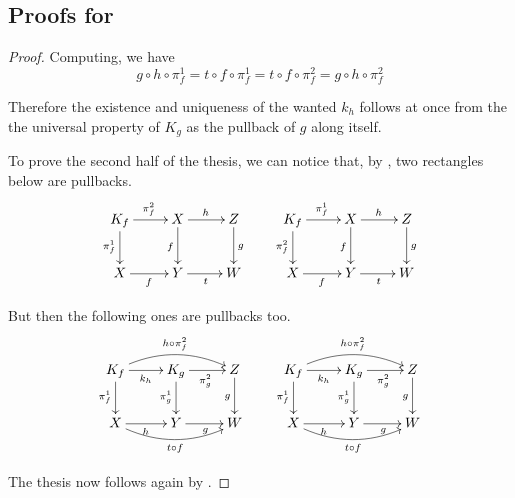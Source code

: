 \documentclass[a4paper,UKenglish,cleveref,pdftex,thm-restate,numberwithinsect]{lipics-v2021}
\def\C{\textbf {\textup{C}}}
\newcommand{\commentato}[1]{ {} }
\newcommand{\mto}{\rightarrowtail}
\newcommand{\id}[1]{\mathsf{id}_{#1}}
\begin{document}
\subsection{Proofs for }\label{app:primo}
\commentato{
\regmono*
\begin{proof}\label{regmono-proof}
	\begin{enumerate}
		\item  Consider the following cube in which the bottom face is an $\mathcal{M}$-pushout.
		\[\xymatrix@C=15pt@R=9pt{&A\ar[dd]|\hole_(.65){\id{A}}\ar[rr]^{g} \ar[dl]_{\id{A}} && B \ar[dd]^{\id{B}} \ar[dl]_(.6){\id{B}} \\ A  \ar@{>->}[dd]_{m}\ar[rr]^(.65){g} & & B \ar@{>->}[dd]_(.3){n}\\&A\ar[rr]|\hole^(.65){g} \ar@{>->}[dl]^{m} && B \ar@{>->}[dl]^{n} \\C \ar[rr]_{f} & & D}\]
		By construction the top face of the cube is a pushout and the back one a pullback. The left face is a pullback because $m$ is mono, thus the Van Kampen property yields that the front and the right faces are pullbacks too and the thesis follows.
		\item Let $m\colon X\mto Y$ be an arrow in $\mathcal{M}$, we can then take its pushout along itself, which, by the previous point, is also a pullback.
		\[\xymatrix{X \ar@{>->}[r]^{m} \ar@{>->}[d]_{m}& Y \ar@{>->}[d]^{h}\\ Y \ar@{>->}[r]^{k} & Z}\]
		It is now immediate to see that $m$ is the equalizer of $h$ and $k$.   \qedhere
	\end{enumerate}
\end{proof}
}

\kpp*
\begin{proof}\label{kpp-proof}
Computing, we have
\[g \circ h \circ \pi_f^1 =  t \circ f \circ \pi_f^1     =  t \circ f \circ \pi_f^2     =  g \circ h \circ \pi_f^2\]

Therefore the existence  and uniqueness of the wanted $k_h$ follows at once from the the universal property of $K_g$ as the pullback of $g$ along itself.

To prove the second half of the thesis, we can notice that, by ,  two rectangles below are pullbacks.
\[\xymatrix{K_f \ar[r]^{\pi^2_f} \ar[d]_{\pi^1_f} & X \ar[r]^{h} \ar[d]_{f} & Z \ar[d]^{g} &  K_f \ar[r]^{\pi^1_f} \ar[d]_{\pi^2_f} & X \ar[r]^{h} \ar[d]_{f} & Z \ar[d]^{g}\\
	X \ar[r]_{f}& Y \ar[r]_{t} & W & X \ar[r]_{f} & Y  \ar[r]_{t}& W}\]

But then the following ones are pullbacks too.
\[\xymatrix{	K_f  \ar@/^.4cm/[rr]^{h\circ\pi^2_f}\ar[r]_{k_h} \ar[d]_{\pi^1_f}& K_g \ar[d]_{\pi^1_g}  \ar[r]_{\pi^2_g}& Z \ar[d]_{g} & K_f  \ar@/^.4cm/[rr]^{h\circ\pi^2_f}\ar[r]_{k_h} \ar[d]_{\pi^1_f}& K_g \ar[d]_{\pi^1_g}  \ar[r]_{\pi^2_g}& Z \ar[d]_{g} \\
	X \ar[r]_{h} \ar@/_.4cm/[rr]_{t\circ f}& Y \ar[r]_{g} & W & X \ar[r]_{h} \ar@/_.4cm/[rr]_{t\circ f}& Y \ar[r]_{g} & W}\]

The thesis now follows again by .   
\end{proof}
\end{document}
